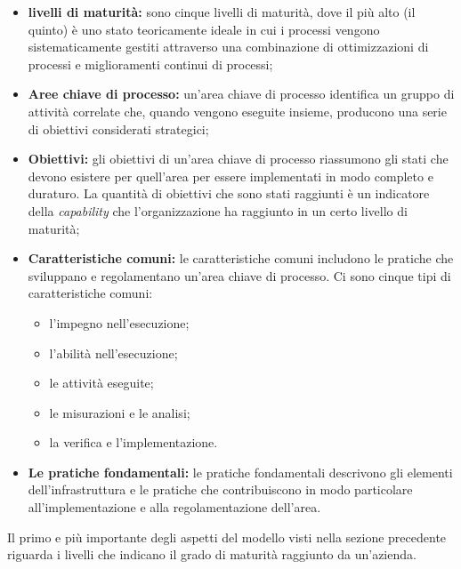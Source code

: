 		\begin{itemize}
			\item \textbf{livelli di maturità:} sono cinque livelli di maturità, dove il più alto (il quinto) è uno stato teoricamente ideale in cui i processi vengono sistematicamente gestiti attraverso una combinazione di ottimizzazioni di processi e miglioramenti continui di processi;
			\item \textbf{Aree chiave di processo:} un'area chiave di processo identifica un gruppo di attività correlate che, quando vengono eseguite insieme, producono una serie di obiettivi considerati strategici;
			\item \textbf{Obiettivi:} gli obiettivi di un'area chiave di processo riassumono gli stati che devono esistere per quell'area  per essere implementati in modo completo e duraturo. La quantità di obiettivi che sono stati raggiunti è un indicatore della \textit{capability} che l'organizzazione ha raggiunto in un certo livello di maturità;
			\item \textbf{Caratteristiche comuni:} le caratteristiche comuni includono le pratiche che sviluppano e regolamentano un'area chiave di processo. Ci sono cinque tipi di caratteristiche comuni:
			\begin{itemize}
				\item l'impegno nell'esecuzione;
				\item l'abilità nell'esecuzione;
				\item le attività eseguite;
				\item le misurazioni e le analisi;
				\item la verifica e l'implementazione.
			\end{itemize}
			\item \textbf{Le pratiche fondamentali:} le pratiche fondamentali descrivono gli elementi dell'infrastruttura e le pratiche che contribuiscono in modo particolare all'implementazione e alla regolamentazione dell'area.
		\end{itemize}
		Il primo e più importante degli aspetti del modello visti nella sezione precedente riguarda i livelli che indicano il grado di maturità raggiunto da un'azienda.
